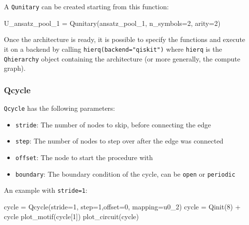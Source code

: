 \documentclass[
  13pt,
  a4paper,
  DIV=11,
  numbers=noendperiod]{scrreprt}
\newenvironment{Shaded}{\begin{snugshade}}{\end{snugshade}}
\newcommand{\DecValTok}[1]{\textcolor[rgb]{0.68,0.00,0.00}{#1}}
\newcommand{\NormalTok}[1]{\textcolor[rgb]{0.00,0.23,0.31}{#1}}
\newcommand{\OperatorTok}[1]{\textcolor[rgb]{0.37,0.37,0.37}{#1}}
\begin{document}
A \texttt{Qunitary} can be created starting from this function:

\begin{Shaded}
\begin{Highlighting}[]
\NormalTok{U\_ansatz\_pool\_1 }\OperatorTok{=}\NormalTok{ Qunitary(ansatz\_pool\_1, n\_symbols}\OperatorTok{=}\DecValTok{2}\NormalTok{, arity}\OperatorTok{=}\DecValTok{2}\NormalTok{)}
\end{Highlighting}
\end{Shaded}

Once the architecture is ready, it is possible to specify the functions
and execute it on a backend by calling \texttt{hierq(backend="qiskit")}
where \texttt{hierq} is the \texttt{Qhierarchy} object containing the
architecture (or more generally, the compute graph).

\subsubsection{Qcycle}\label{qcycle}

\texttt{Qcycle} has the following parameters:

\begin{itemize}
\item
  \texttt{stride}: The number of nodes to skip, before connecting the
  edge
\item
  \texttt{step}: The number of nodes to step over after the edge was
  connected
\item
  \texttt{offset}: The node to start the procedure with
\item
  \texttt{boundary}: The boundary condition of the cycle, can be
  \texttt{open} or \texttt{periodic}
\end{itemize}

An example with \texttt{stride=1}:

\begin{Shaded}
\begin{Highlighting}[]
\NormalTok{cycle }\OperatorTok{=}\NormalTok{ Qcycle(stride}\OperatorTok{=}\DecValTok{1}\NormalTok{, step}\OperatorTok{=}\DecValTok{1}\NormalTok{,offset}\OperatorTok{=}\DecValTok{0}\NormalTok{, mapping}\OperatorTok{=}\NormalTok{u0\_2)}
\NormalTok{cycle }\OperatorTok{=}\NormalTok{ Qinit(}\DecValTok{8}\NormalTok{) }\OperatorTok{+}\NormalTok{ cycle}
\NormalTok{plot\_motif(cycle[}\DecValTok{1}\NormalTok{])}
\NormalTok{plot\_circuit(cycle)}
\end{Highlighting}
\end{Shaded}
\end{document}
